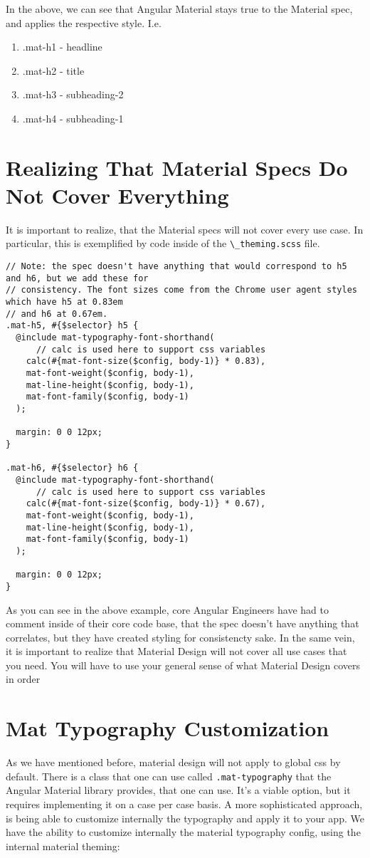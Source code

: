 In the above, we can see that Angular Material stays true to the Material
spec, and applies the respective style. I.e. 
\begin{enumerate}
  \item .mat-h1 - headline
  \item .mat-h2 - title
  \item .mat-h3 - subheading-2
  \item .mat-h4 - subheading-1
\end{enumerate}

\section{Realizing That Material Specs Do Not Cover Everything}
It is important to realize, that the Material specs will not cover
every use case. In particular, this is exemplified by code inside of 
the \lstinline{\_theming.scss} file. 

\begin{lstlisting}
// Note: the spec doesn't have anything that would correspond to h5 and h6, but we add these for
// consistency. The font sizes come from the Chrome user agent styles which have h5 at 0.83em
// and h6 at 0.67em.
.mat-h5, #{$selector} h5 {
  @include mat-typography-font-shorthand(
      // calc is used here to support css variables
    calc(#{mat-font-size($config, body-1)} * 0.83),
    mat-font-weight($config, body-1),
    mat-line-height($config, body-1),
    mat-font-family($config, body-1)
  );

  margin: 0 0 12px;
}

.mat-h6, #{$selector} h6 {
  @include mat-typography-font-shorthand(
      // calc is used here to support css variables
    calc(#{mat-font-size($config, body-1)} * 0.67),
    mat-font-weight($config, body-1),
    mat-line-height($config, body-1),
    mat-font-family($config, body-1)
  );

  margin: 0 0 12px;
}
\end{lstlisting}

As you can see in the above example, core Angular Engineers have had to comment 
inside of their core code base, that the spec doesn't have anything that 
correlates, but they have created styling for consistencty sake. In the same vein,
it is important to realize that Material Design will not cover all use cases 
that you need. You will have to use your general sense of what Material Design 
covers in order 

\section{Mat Typography Customization}
As we have mentioned before, material design will not apply to global css by 
default. There is a class that one can use called \lstinline{.mat-typography}
that the Angular Material library provides, that one can use. It's a viable 
option, but it requires implementing it on a case per case basis. A more 
sophisticated approach, is being able to customize internally the typography 
and apply it to your app. We have the ability to customize internally the 
material typography config, using the internal material theming: 

